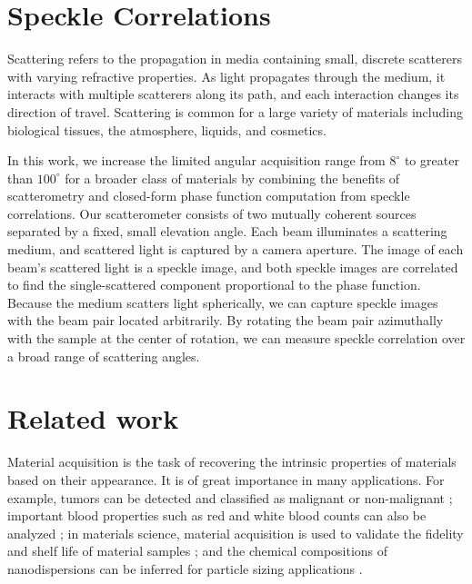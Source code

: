 \section{Speckle Correlations}

Scattering refers to the propagation in media containing small, discrete scatterers with varying refractive properties. As light propagates through the medium, it interacts with multiple scatterers along its path, and each interaction changes its direction of travel. Scattering is common for a large variety of materials including biological tissues, the atmosphere, liquids, and cosmetics.

In this work, we increase the limited angular acquisition range from $8^\circ$ to greater than $100^\circ$ for a broader class of materials by combining the benefits of scatterometry and closed-form phase function computation from speckle correlations. Our scatterometer consists of two mutually coherent sources separated by a fixed, small elevation angle. Each beam illuminates a scattering medium, and scattered light is captured by a camera aperture. The image of each beam's scattered light is a speckle image, and both speckle images are correlated to find the single-scattered component proportional to the phase function. Because the medium scatters light spherically, we can capture speckle images with the beam pair located arbitrarily. By rotating the beam pair azimuthally with the sample at the center of rotation, we can measure speckle correlation over a broad range of scattering angles.

\section{Related work} %

Material acquisition is the task of recovering the intrinsic properties of materials based on their appearance. It is of great importance in many applications. For example, tumors can be detected and classified as malignant or non-malignant \cite{boas2001imaging}; important blood properties such as red and white blood counts can also be analyzed \cite{berne2000dynamic, durduran2010diffuse}; in materials science, material acquisition is used to validate the fidelity and shelf life of material samples \cite{sumin2019geometry}; and the chemical compositions of nanodispersions can be inferred for particle sizing applications \cite{pine1990diffusing}.

